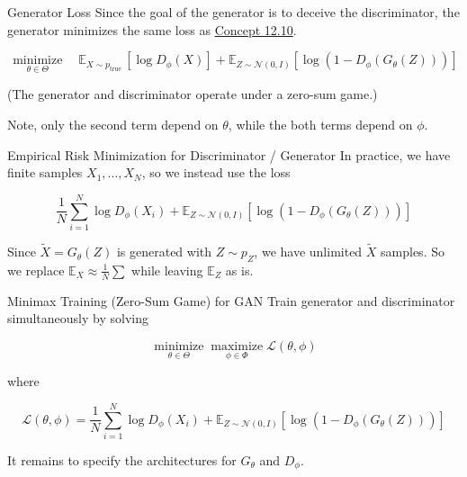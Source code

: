 \begin{frame}[allowframebreaks]

\begin{myconceptblock}{12.11}{Generator Loss}
    Since the goal of the generator is to deceive the discriminator, the generator minimizes the same loss as \hyperref[concept:12.10]{Concept 12.10}.

    $$
    \underset{\theta \in \Theta}{\operatorname{minimize}} \quad \mathbb{E}_{X \sim p_{\text {true }}}\left[\log D_{\phi}(X)\right]+\mathbb{E}_{Z \sim \mathcal{N}(0, I)}\left[\log \left(1-D_{\phi}\left(G_{\theta}(Z)\right)\right)\right]
    $$

    (The generator and discriminator operate under a zero-sum game.)

    Note, only the second term depend on $\theta$, while the both terms depend on $\phi$.
\end{myconceptblock}

\end{frame}

\begin{frame}[allowframebreaks]

\begin{myconceptblock}{12.12}{Empirical Risk Minimization for Discriminator / Generator}
    In practice, we have finite samples $X_{1}, \ldots, X_{N}$, so we instead use the loss

    $$
    \frac{1}{N} \sum_{i=1}^{N} \log D_{\phi}\left(X_{i}\right)+\mathbb{E}_{Z \sim \mathcal{N}(0, I)}\left[\log \left(1-D_{\phi}\left(G_{\theta}(Z)\right)\right)\right]
    $$

    Since $\tilde{X}=G_{\theta}(Z)$ is generated with $Z \sim p_{Z}$, we have unlimited $\tilde{X}$ samples. So we replace $\mathbb{E}_{X} \approx \frac{1}{N} \sum$ while leaving $\mathbb{E}_{Z}$ as is.
\end{myconceptblock}

\end{frame}

\begin{frame}[allowframebreaks]

\begin{mydefinitionblock}{12.13}{Minimax Training (Zero-Sum Game) for GAN}
    Train generator and discriminator simultaneously by solving

    $$
    \underset{\theta \in \Theta}{\operatorname{minimize}} \underset{\phi \in \Phi}{\operatorname{maximize}} \mathcal{L}(\theta, \phi)
    $$

    where

    $$
    \mathcal{L}(\theta, \phi)=\frac{1}{N} \sum_{i=1}^{N} \log D_{\phi}\left(X_{i}\right)+\mathbb{E}_{Z \sim \mathcal{N}(0, I)}\left[\log \left(1-D_{\phi}\left(G_{\theta}(Z)\right)\right)\right]
    $$

    It remains to specify the architectures for $G_{\theta}$ and $D_{\phi}$.
\end{mydefinitionblock}

\end{frame}

